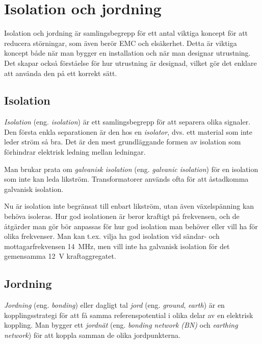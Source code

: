 \chapter{Isolation och jordning}

Isolation och jordning är samlingsbegrepp för ett antal viktiga koncept för
att reducera störningar, som även berör EMC och elsäkerhet. Detta är viktiga
koncept både när man bygger en installation och när man designar utrustning.
Det skapar också förståelse för hur utrustning är designad, vilket gör det
enklare att använda den på ett korrekt sätt.

\section{Isolation}

\emph{Isolation} (eng. \emph{isolation}) är ett samlingsbegrepp för att separera
olika signaler. Den första enkla separationen är den hos en \emph{isolator},
dvs. ett material som inte leder ström så bra. Det är den mest grundläggande
formen av isolation som förhindrar elektrisk ledning mellan ledningar.

Man brukar prata om \emph{galvanisk isolation} (eng. \emph{galvanic isolation})
för en isolation som inte kan leda likström. Transformatorer används ofta för
att åstadkomma galvanisk isolation.

Nu är isolation inte begränsat till enbart likström, utan även växelspänning
kan behöva isoleras. Hur god isolationen är beror kraftigt på frekvensen, och
de åtgärder man gör bör anpassas för hur god isolation man behöver eller vill
ha för olika frekvenser. Man kan t.ex. vilja ha god isolation vid sändar- och
mottagarfrekvensen 14~MHz, men vill inte ha galvanisk isolation för det
gemensamma 12~V kraftaggregatet.

\section{Jordning}

\emph{Jordning} (eng. \emph{bonding}) eller dagligt tal \emph{jord} (eng.
\emph{ground}, \emph{earth}) är en kopplingsstrategi för att få samma
referenspotential i olika delar av en elektrisk koppling. Man bygger ett
\emph{jordnät} (eng. \emph{bonding network (BN)} \cite[3.2.1]{K27-1991} och
\emph{earthing network}) \cite[3.1.3]{K27-1991} för att koppla samman de olika
jordpunkterna.

